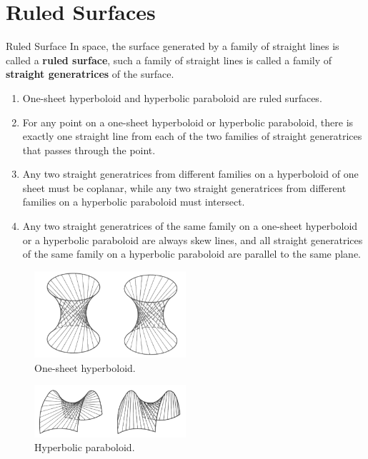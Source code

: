 \documentclass[11pt]{../../TexTemplate/elegantbook} %
\begin{document}
\section{Ruled Surfaces}
\begin{definition}{Ruled Surface}
    In space, the surface generated by a family of straight lines is called a \textbf{ruled surface},
    such a family of straight lines is called a family of \textbf{straight generatrices} of the surface.
\end{definition}

\begin{proposition}
    \begin{enumerate}
        \item One-sheet hyperboloid and hyperbolic paraboloid are ruled surfaces. 
        \item For any point on a one-sheet hyperboloid or hyperbolic paraboloid, 
            there is exactly one straight line from each of the two families of straight generatrices 
            that passes through the point.
        \item Any two straight generatrices from different families on a hyperboloid of one sheet must be coplanar, 
            while any two straight generatrices from different families on a hyperbolic paraboloid must intersect.
        \item Any two straight generatrices of the same family on a one-sheet hyperboloid or a hyperbolic paraboloid 
            are always skew lines, 
            and all straight generatrices of the same family on a hyperbolic paraboloid are parallel to the same plane.
    \end{enumerate}
\end{proposition}

\begin{figure}[h]
    \centering
    \includegraphics[width=0.5\textwidth]{img/ruled-surface1.png}
    \caption{One-sheet hyperboloid.}
    \label{fig:RuledSurface1}
\end{figure}

\begin{figure}[h]
    \centering
    \includegraphics[width=0.5\textwidth]{img/ruled-surface2.png}
    \caption{Hyperbolic paraboloid.}
    \label{fig:RuledSurface2}
\end{figure}
\end{document}
